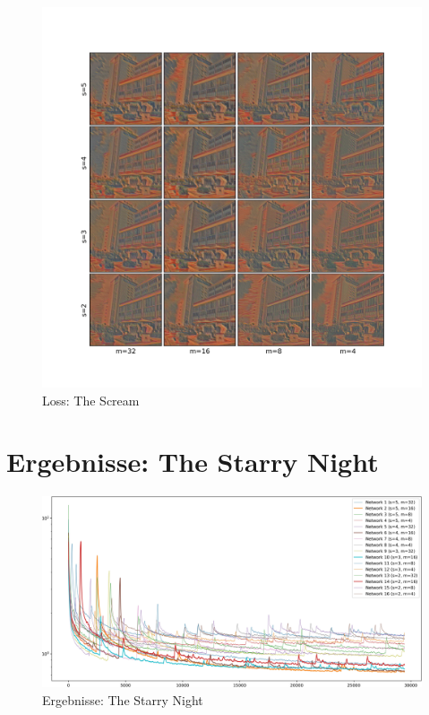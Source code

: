 \begin{figure}[H]
	\centering
	\includegraphics[width=1.00\textwidth]{resources/content/experiments/fast_image_grid_experiment2.jpg}
	\caption{Loss: The Scream}
	\label{img:loss_the_scream}
\end{figure}

\pagebreak

\section{Ergebnisse: The Starry Night}
\begin{figure}[H]
	\centering
	\includegraphics[width=1.00\textwidth]{resources/content/experiments/fast_loss_plot_experiment1.jpg}
	\caption{Ergebnisse: The Starry Night}
	\label{img:results_the_starry_night}
\end{figure}

